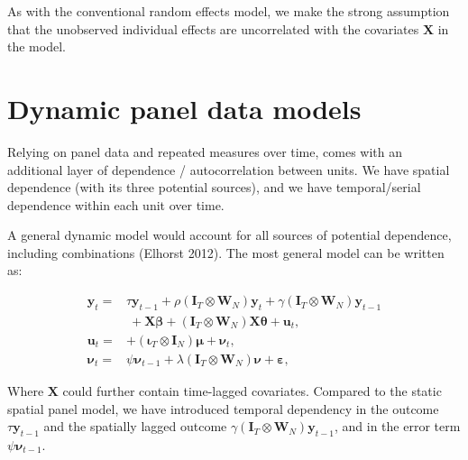 \documentclass[
  letterpaper,
]{scrbook}
\begin{document}
As with the conventional random effects model, we make the strong
assumption that the unobserved individual effects are uncorrelated with
the covariates \(\boldsymbol{\mathbf{X}}\) in the model.

\hypertarget{dynamic-panel-data-models}{%
\section{Dynamic panel data models}\label{dynamic-panel-data-models}}

Relying on panel data and repeated measures over time, comes with an
additional layer of dependence / autocorrelation between units. We have
spatial dependence (with its three potential sources), and we have
temporal/serial dependence within each unit over time.

A general dynamic model would account for all sources of potential
dependence, including combinations (Elhorst 2012). The most general
model can be written as:

\[
\begin{split}
        {\boldsymbol{\mathbf{y}}_t}=& \tau \boldsymbol{\mathbf{y}}_{t-1} + \rho(\boldsymbol{\mathbf{I}}_T\otimes {\boldsymbol{\mathbf{W}}_N}){\boldsymbol{\mathbf{y}}}_t
        + \gamma(\boldsymbol{\mathbf{I}}_T\otimes {\boldsymbol{\mathbf{W}}_N}){\boldsymbol{\mathbf{y}}_{t-1}}\\
        &~+ {\boldsymbol{\mathbf{X}}}{\boldsymbol{\mathbf{\beta}}}+ (\boldsymbol{\mathbf{I}}_T\otimes {\boldsymbol{\mathbf{W}}_N}){\boldsymbol{\mathbf{X}}}{\boldsymbol{\mathbf{\theta}}}+ {\boldsymbol{\mathbf{u}}}_t,\\
        {\boldsymbol{\mathbf{u}}_t}=&  + (\boldsymbol{\mathbf{\iota}}_T \otimes {\boldsymbol{\mathbf{I}}_N})\boldsymbol{\mathbf{\mu}}+ {\boldsymbol{\mathbf{\nu}}_t},\\
        {\boldsymbol{\mathbf{\nu}}_t}=& \psi{\boldsymbol{\mathbf{\nu}}}_{t-1} + \lambda(\boldsymbol{\mathbf{I}}_T \otimes {\boldsymbol{\mathbf{W}}_N})\boldsymbol{\mathbf{\nu }}+ {\boldsymbol{\mathbf{\varepsilon}}},
\end{split}     
\]

Where \({\boldsymbol{\mathbf{X}}}\) could further contain time-lagged
covariates. Compared to the static spatial panel model, we have
introduced temporal dependency in the outcome
\(\tau \boldsymbol{\mathbf{y}}_{t-1}\) and the spatially lagged outcome
\(\gamma(\boldsymbol{\mathbf{I}}_T\otimes {\boldsymbol{\mathbf{W}}_N}){\boldsymbol{\mathbf{y}}_{t-1}}\),
and in the error term \(\psi{\boldsymbol{\mathbf{\nu}}}_{t-1}\).
\end{document}
